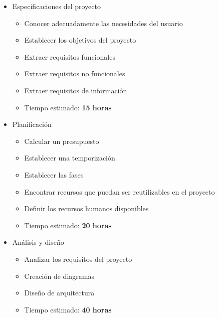 \begin{itemize}
  \item Especificaciones del proyecto
  \begin{itemize}
    \item{Conocer adecuadamente las necesidades del usuario}
    \item{Establecer los objetivos del proyecto}
    \item{Extraer requisitos funcionales}
    \item{Extraer requisitos no funcionales}
    \item{Extraer requisitos de información}
    \item{Tiempo estimado: \textbf{15 horas}}
  \end{itemize}
\end{itemize}

\begin{itemize}
  \item Planificación
  \begin{itemize}
    \item{Calcular un presupuesto}
    \item{Establecer una temporización}
    \item{Establecer las fases}
    \item{Encontrar recursos que puedan ser reutilizables en el proyecto}
    \item{Definir los recursos humanos disponibles}
    \item{Tiempo estimado: \textbf{20 horas}}
  \end{itemize}
\end{itemize}

\begin{itemize}
  \item Análisis y diseño
  \begin{itemize}
    \item{Analizar los requisitos del proyecto}
    \item{Creación de diagramas}
    \item{Diseño de arquitectura}
    \item{Tiempo estimado: \textbf{40 horas}}
  \end{itemize}
\end{itemize}


